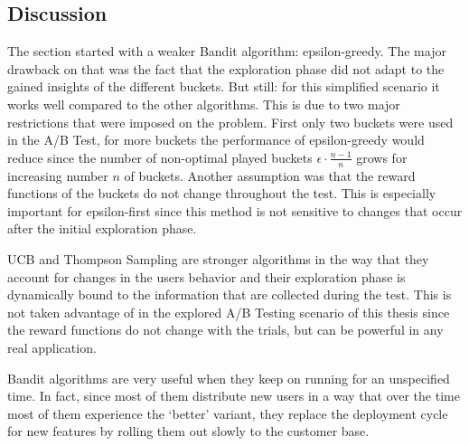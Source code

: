 \documentclass[main.tex]{subfiles}
\begin{document}
\subsection{Discussion}
The section started with a weaker Bandit algorithm: epsilon-greedy. The major drawback on that was the fact that the exploration phase did not adapt to the gained insights of the different buckets. But still: for this simplified scenario it works well compared to the other algorithms. This is due to two major restrictions that were imposed on the problem. First only two buckets were used in the A/B Test, for more buckets the performance of epsilon-greedy would reduce since the number of non-optimal played buckets $\epsilon \cdot \frac{n-1}{n}$ grows for increasing number $n$ of buckets. Another assumption was that the reward functions of the buckets do not change throughout the test. This is especially important for epsilon-first since this method is not sensitive to changes that occur after the initial exploration phase.

UCB and Thompson Sampling are stronger algorithms in the way that they account for changes in the users behavior and their exploration phase is dynamically bound to the information that are collected during the test. This is not taken advantage of in the explored A/B Testing scenario of this thesis since the reward functions do not change with the trials, but can be powerful in any real application.

Bandit algorithms are very useful when they keep on running for an unspecified time. In fact, since most of them distribute new users in a way that over the time most of them experience the `better' variant, they replace the deployment cycle for new features by rolling them out slowly to the customer base.
\end{document}
